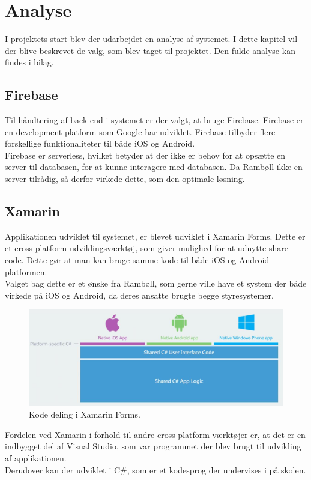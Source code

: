 \chapter{Analyse}
I projektets start blev der udarbejdet en analyse af systemet. I dette kapitel vil der blive beskrevet de valg, som blev taget til projektet. Den fulde analyse kan findes i bilag. \\

\section{Firebase}
	Til håndtering af back-end i systemet er der valgt, at bruge Firebase. Firebase\cite{Firebase} er en development platform som Google har udviklet. Firebase tilbyder flere forskellige funktionaliteter til både iOS og Android. \\
	Firebase er serverless, hvilket betyder at der ikke er behov for at opsætte en server til databasen, for at kunne interagere med databasen. Da Rambøll ikke en server tilrådig, så derfor virkede dette, som den optimale løsning. \\

\section{Xamarin}
	Applikationen udviklet til systemet, er blevet udviklet i Xamarin Forms\cite{Xarmain}. Dette er et cross platform udviklingsværktøj, som giver mulighed for at udnytte share code. Dette gør at man kan bruge samme kode til både iOS og Android platformen. \\
	Valget bag dette er et ønske fra Rambøll, som gerne ville have et system der både virkede på iOS og Android, da deres ansatte brugte begge styresystemer.
	
	\begin{figure}[H]
		\centering
		\includegraphics[width=1\linewidth]{Analyse/XarmarinShare}
		\caption{Kode deling i Xamarin Forms.\cite{Xarmain}}
		\label{fig:CodeShare}
	\end{figure}
	
	Fordelen ved Xamarin i forhold til andre cross platform værktøjer er, at det er en indbygget del af Visual Studio, som var programmet der blev brugt til udvikling af applikationen. \\
	Derudover kan der udviklet i C\#, som er et kodesprog der undervises i på skolen.